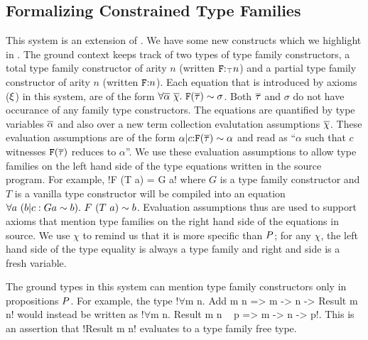 \documentclass[format=sigplan,manuscript,review,screen,nonacm,margin=1in]{acmart}
\begin{document}
\subsection{Formalizing Constrained Type Families}\label{subsec:tf-constrained-formal}
This system is an extension of \CLTF. We have some new constructs which
we highlight in . The ground context keeps track of
two types of type family constructors, a total type family constructor of arity $n$ (written $\texttt{F}{:}_\top n$)
and a partial type family constructor of arity $n$ (written $\texttt{F}{:} n$). Each equation that is introduced
by axioms ($\xi$) in this system, are of the form $\forall\overline{\alpha}~\overline{\chi}.~\texttt{F}(\overline{\tau})\mathrel{\sim}\sigma$.
Both $\overline{\tau}$ and $\sigma$ do not have occurance of any family type constructors. 
The equations are quantified by type variables $\overline{\alpha}$
and also over a new term collection evalutation assumptions $\overline{\chi}$.
These evaluation assumptions are of the form $\alpha|c{:}\texttt{F}(\overline{\tau})\mathrel{\sim}\alpha$ and read as
``$\alpha$ such that $c$ witnesses $\texttt{F}(\overline{\tau})$ reduces to $\alpha$''. We use these evaluation assumptions
to allow type families on the left hand side of the type equations written in the source program. For example,
!F (T a) = G a! where $G$ is a type family constructor and $T$ is a vanilla type constructor will
be compiled into an equation $\forall a~(b|c:G a \mathrel{\sim} b).~ F~(T~a) \mathrel{\sim} b$. Evaluation assumptions thus
are used to support axioms that mention type families on the right hand side of the equations in source.
We use $\chi$ to remind us that it is more specific than $P$; for any $\chi$,
the left hand side of the type equality is always a type family and right and side is a fresh variable.

The ground types in this system can mention type family constructors only in propositions $P$.
For example, the type !$\forall$m n. Add m n => m -> n -> Result m n! would instead be written
as !$\forall$m n. Result m n ~ p => m -> n -> p!. This is an assertion that !Result m n! evaluates to a
type family free type.
\end{document}

